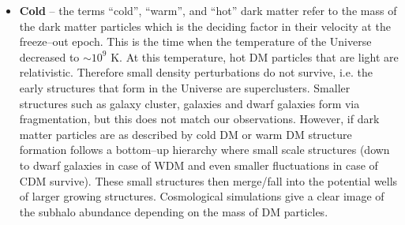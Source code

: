 \documentclass[a4wide,12pt]{book}
\begin{document}
{\begin{itemize}
  \item {\bf Cold} -- the terms ``cold'', ``warm'', and ``hot'' dark matter refer to the mass of the dark matter particles which is the deciding factor in their velocity at the freeze--out epoch. This is the time when the temperature of the Universe decreased to $\sim 10^9$ K. At this temperature, hot DM particles that are light are relativistic. Therefore small density perturbations do not survive, i.e. the early structures that form in the Universe are superclusters. Smaller structures such as galaxy cluster, galaxies and dwarf galaxies form via fragmentation, but this does not match our observations. However, if dark matter particles are as described by cold DM or warm DM structure formation follows a bottom--up hierarchy where small scale structures (down to dwarf galaxies in case of WDM and even smaller fluctuations in case of CDM survive). These small structures then merge/fall into the potential wells of larger growing structures. Cosmological simulations give a clear image of the subhalo abundance depending on the mass of DM particles.%
  \end{itemize}




}
\end{document}
